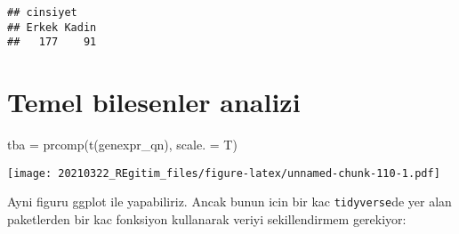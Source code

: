 \documentclass[
]{book}
\newenvironment{Shaded}{\begin{snugshade}}{\end{snugshade}}
\newcommand{\AttributeTok}[1]{\textcolor[rgb]{0.77,0.63,0.00}{#1}}
\newcommand{\DecValTok}[1]{\textcolor[rgb]{0.00,0.00,0.81}{#1}}
\newcommand{\FloatTok}[1]{\textcolor[rgb]{0.00,0.00,0.81}{#1}}
\newcommand{\FunctionTok}[1]{\textcolor[rgb]{0.00,0.00,0.00}{#1}}
\newcommand{\NormalTok}[1]{#1}
\newcommand{\OtherTok}[1]{\textcolor[rgb]{0.56,0.35,0.01}{#1}}
\newcommand{\SpecialCharTok}[1]{\textcolor[rgb]{0.00,0.00,0.00}{#1}}
\newcommand{\StringTok}[1]{\textcolor[rgb]{0.31,0.60,0.02}{#1}}
\begin{document}
\begin{verbatim}
## cinsiyet
## Erkek Kadin 
##   177    91
\end{verbatim}

\hypertarget{temel-bilesenler-analizi}{%
\chapter{Temel bilesenler analizi}\label{temel-bilesenler-analizi}}

\begin{Shaded}
\begin{Highlighting}[]
\NormalTok{tba }\OtherTok{=} \FunctionTok{prcomp}\NormalTok{(}\FunctionTok{t}\NormalTok{(genexpr\_qn), }\AttributeTok{scale. =}\NormalTok{ T)}
\end{Highlighting}
\end{Shaded}

\begin{Shaded}
\end{Shaded}

\texttt{[image: 20210322\_REgitim\_files/figure-latex/unnamed-chunk-110-1.pdf]}

Ayni figuru ggplot ile yapabiliriz. Ancak bunun icin bir kac \texttt{tidyverse}de yer alan paketlerden bir kac fonksiyon kullanarak veriyi sekillendirmem gerekiyor:
\end{document}

